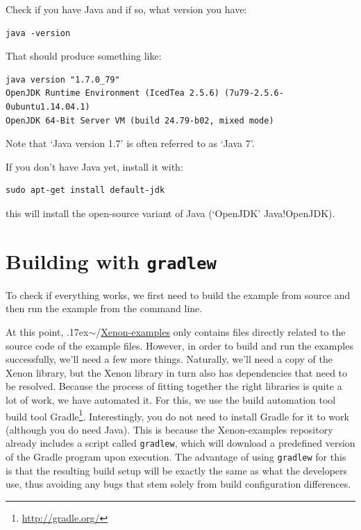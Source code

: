 \documentclass[12pt, a4paper, twoside, openany, titlepage]{book}
\newcommand{\mytilde}{\raise.17ex\hbox{$\scriptstyle\sim$}}
\begin{document}
Check if you have Java and if so, what version you have:
\begin{lstlisting}[style=basic,style=bash]
java -version
\end{lstlisting}
That should produce something like:
\begin{lstlisting}[style=basic,style=bash]
java version "1.7.0_79"
OpenJDK Runtime Environment (IcedTea 2.5.6) (7u79-2.5.6-0ubuntu1.14.04.1)
OpenJDK 64-Bit Server VM (build 24.79-b02, mixed mode)
\end{lstlisting}
Note that `Java version 1.7' is often referred to as `Java 7'.

If you don't have Java yet, install it with:
\begin{lstlisting}[style=basic,style=bash]
sudo apt-get install default-jdk
\end{lstlisting}
this will install the open-source variant of Java (`OpenJDK'\index
{Java!OpenJDK}).






\section{Building with \texttt{gradlew}}

To check if everything works, we first need to build the example from source
and then run the example from the command line.

At this point, \mytilde/\url{Xenon-examples} only contains files directly
related to the source code of the example files. However, in order to build
and run the examples successfully, we'll need a few more things. Naturally,
we'll need a copy of the Xenon library, but the Xenon library in turn also
has dependencies that need to be resolved. Because the process of fitting
together the right libraries is quite a lot of work, we have automated it.
For this, we use the build automation tool\index
{build tool} Gradle\footnote{\url{http://gradle.org/}}.
Interestingly, you do not need to install Gradle for it to work (although
you do need Java). This is because the Xenon-examples repository already
includes a script called \texttt{gradlew}, which will download a predefined
version of the Gradle program upon execution. The advantage of using \texttt
{gradlew} for this is that the resulting build setup will be exactly the
same as what the developers use, thus avoiding any bugs that stem solely
from build configuration differences.
\end{document}
